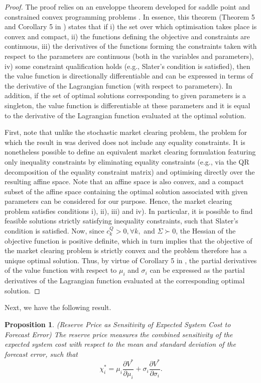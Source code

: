 \documentclass{article}
\newtheorem{proposition}{Proposition}
\begin{document}
\begin{proof}
The proof relies on an enveloppe theorem developed for saddle point and constrained convex programming problems \cite{Milgrom2002}. In essence, this theorem (Theorem 5 and Corollary 5 in \cite{Milgrom2002}) states that if i) the set over which optimisation takes place is convex and compact, ii) the functions defining the objective and constraints are continuous, iii) the derivatives of the functions forming the constraints taken with respect to the parameters are continuous (both in the variables and parameters), iv) some constraint qualification holds (e.g., Slater's condition is satisfied), then the value function is directionally differentiable and can be expressed in terms of the derivative of the Lagrangian function (with respect to parameters). In addition, if the set of optimal solutions corresponding to given parameters is a singleton, the value function is differentiable at these parameters and it is equal to the derivative of the Lagrangian function evaluated at the optimal solution.

First, note that unlike the stochastic market clearing problem, the problem for which the result in \cite{Milgrom2002} was derived does not include any equality constraints. It is nonetheless possible to define an equivalent market clearing formulation featuring only inequality constraints by eliminating equality constraints (e.g., via the QR decomposition of the equality constraint matrix) and optimising directly over the resulting affine space. Note that an affine space is also convex, and a compact subset of the affine space containing the optimal solution associated with given parameters can be considered for our purpose. Hence, the market clearing problem satisfies conditions i), ii), iii) and iv). In particular, it is possible to find feasible solutions strictly satisfying inequality constraints, such that Slater's condition is satisfied. Now, since $c_k^Q > 0, \forall k,$ and $\Sigma \succ 0$, the Hessian of the objective function is positive definite, which in turn implies that the objective of the market clearing problem is strictly convex and the problem therefore has a unique optimal solution. Thus, by virtue of Corollary 5 in \cite{Milgrom2002}, the partial derivatives of the value function with respect to $\mu_i$ and $\sigma_i$ can be expressed as the partial derivatives of the Lagrangian function evaluated at the corresponding optimal solution.
\end{proof}
Next, we have the following result.
\begin{proposition}
(Reserve Price as Sensitivity of Expected System Cost to Forecast Error) The reserve price measures the combined sensitivity of the expected system cost with respect to the mean and standard deviation of the forecast error, such that
\begin{equation*}
\chi_i^* = \mu_i \frac{\partial V^*}{\partial \mu_i} + \sigma_i \frac{\partial V^*}{\partial \sigma_i}.
\end{equation*}
\end{proposition}
\end{document}
